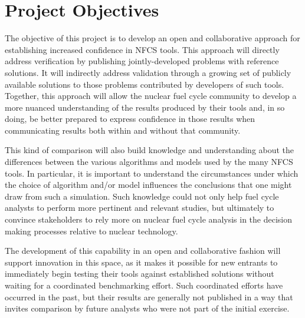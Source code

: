 \section{Project Objectives}

The objective of this project is to develop an open and collaborative approach
for establishing increased confidence in \gls{NFCS} tools. This approach will
directly address verification by publishing jointly-developed problems with
reference solutions.  It will indirectly address validation through a growing
set of publicly available solutions to those problems contributed by
developers of such tools.  Together, this approach will allow the nuclear
fuel cycle community to develop a more nuanced understanding of the results
produced by their tools and, in so doing, be better prepared to express
confidence in those results when communicating results both within and without
that community.

This kind of comparison will also build knowledge and understanding about the
differences between the various algorithms and models used by the many
\gls{NFCS} tools. In particular, it is important to understand the
circumstances under which the choice of algorithm and/or model influences the
conclusions that one might draw from such a simulation. Such knowledge could
not only help fuel cycle analysts to perform more pertinent and relevant
studies, but ultimately to convince stakeholders to rely more on nuclear fuel
cycle analysis in the decision making processes relative to nuclear
technology.

The development of this capability in an open and collaborative fashion will
support innovation in this space, as it makes it possible for new entrants to
immediately begin testing their tools against established solutions without
waiting for a coordinated benchmarking effort.  Such coordinated efforts have
occurred in the past, but their results are generally not published in a way
that invites comparison by future analysts who were not part of the initial
exercise.


